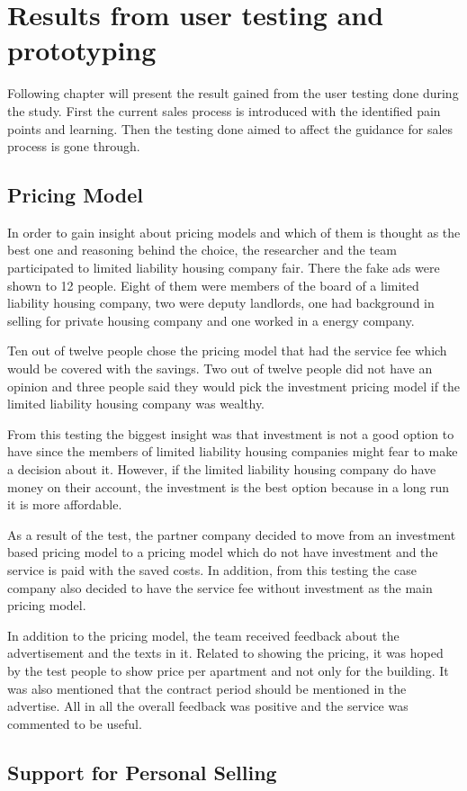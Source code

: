 \section{Results from user testing and prototyping}

Following chapter will present the result gained from the user testing done during the study. First the current sales process is introduced with the identified pain points and learning. Then the testing done aimed to affect the guidance for sales process is gone through.

\subsection{Pricing Model}

In order to gain insight about pricing models and which of them is thought as the best one and reasoning behind the choice, the researcher and the team participated to limited liability housing company fair. There the fake ads were shown to 12 people. Eight of them were members of the board of a limited liability housing company, two were deputy landlords, one had background in selling for private housing company and one worked in a energy company.

Ten out of twelve people chose the pricing model that had the service fee which would be covered with the savings. Two out of twelve people did not have an opinion and three people said they would pick the investment pricing model if the limited liability housing company was wealthy.

From this testing the biggest insight was that investment is not a good option to have since the members of limited liability housing companies might fear to make a decision about it. However, if the limited liability housing company do have money on their account, the investment is the best option because in a long run it is more affordable.

As a result of the test, the partner company decided to move from an investment based pricing model to a pricing model which do not have investment and the service is paid with the saved costs. In addition, from this testing the case company also decided to have the service fee without investment as the main pricing model.

In addition to the pricing model, the team received feedback about the advertisement and the texts in it. Related to showing the pricing, it was hoped by the test people to show price per apartment and not only for the building. It was also mentioned that the contract period should be mentioned in the advertise. All in all the overall feedback was positive and the service was commented to be useful.

\subsection{Support for Personal Selling}





